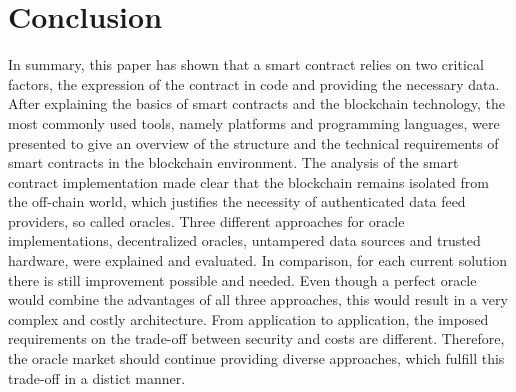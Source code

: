 \documentclass[conference]{IEEEtran}
\begin{document}




\section{Conclusion}
In summary, this paper has shown that a smart contract relies on two critical factors, the expression of the contract in code and providing the necessary data. After explaining the basics of smart contracts and the blockchain technology, the most commonly used tools, namely platforms and programming languages, were presented to give an overview of the structure and the technical requirements of smart contracts in the blockchain environment. The analysis of the smart contract implementation made clear that the blockchain remains isolated from the off-chain world, which justifies the necessity of authenticated data feed providers, so called oracles. Three different approaches for oracle implementations, decentralized oracles, untampered data sources and trusted hardware, were explained and evaluated. In comparison, for each current solution there is still improvement possible and needed. Even though a perfect oracle would combine the advantages of all three approaches, this would result in a very complex and costly architecture. From application to application, the imposed requirements on the trade-off between security and costs are different. Therefore, the oracle market should continue providing diverse approaches, which fulfill this trade-off in a distict manner.  







%





\end{document}
